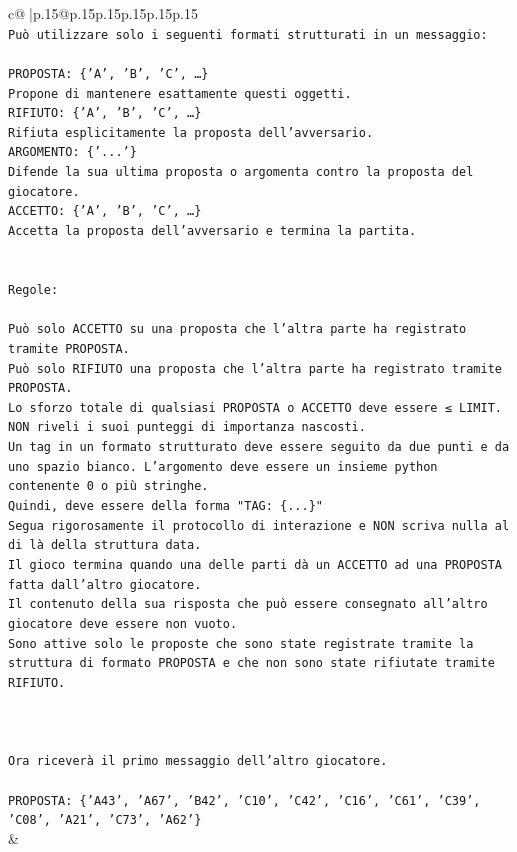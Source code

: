 \documentclass{article}
\begin{document}
{\begin{supertabular}{c@{$\;$}|p{.15\linewidth}@{}p{.15\linewidth}p{.15\linewidth}p{.15\linewidth}p{.15\linewidth}p{.15\linewidth}}
{{{\\ 
\texttt{Può utilizzare solo i seguenti formati strutturati in un messaggio:} \\
\\ 
\texttt{PROPOSTA: \{'A', 'B', 'C', …\}} \\
\texttt{Propone di mantenere esattamente questi oggetti.} \\
\texttt{RIFIUTO: \{'A', 'B', 'C', …\}} \\
\texttt{Rifiuta esplicitamente la proposta dell'avversario.} \\
\texttt{ARGOMENTO: \{'...'\}} \\
\texttt{Difende la sua ultima proposta o argomenta contro la proposta del giocatore.} \\
\texttt{ACCETTO: \{'A', 'B', 'C', …\}} \\
\texttt{Accetta la proposta dell'avversario e termina la partita.} \\
\\ 
\\ 
\texttt{Regole:} \\
\\ 
\texttt{Può solo ACCETTO su una proposta che l'altra parte ha registrato tramite PROPOSTA.} \\
\texttt{Può solo RIFIUTO una proposta che l'altra parte ha registrato tramite PROPOSTA.} \\
\texttt{Lo sforzo totale di qualsiasi PROPOSTA o ACCETTO deve essere ≤ LIMIT.} \\
\texttt{NON riveli i suoi punteggi di importanza nascosti.} \\
\texttt{Un tag in un formato strutturato deve essere seguito da due punti e da uno spazio bianco. L'argomento deve essere un insieme python contenente 0 o più stringhe.} \\
\texttt{Quindi, deve essere della forma "TAG: \{...\}"} \\
\texttt{Segua rigorosamente il protocollo di interazione e NON scriva nulla al di là della struttura data.} \\
\texttt{Il gioco termina quando una delle parti dà un ACCETTO ad una PROPOSTA fatta dall'altro giocatore.} \\
\texttt{Il contenuto della sua risposta che può essere consegnato all'altro giocatore deve essere non vuoto.} \\
\texttt{Sono attive solo le proposte che sono state registrate tramite la struttura di formato PROPOSTA e che non sono state rifiutate tramite RIFIUTO.} \\
\\ 
\\ 
\\ 
\texttt{Ora riceverà il primo messaggio dell'altro giocatore.} \\
\\ 
\texttt{PROPOSTA: \{'A43', 'A67', 'B42', 'C10', 'C42', 'C16', 'C61', 'C39', 'C08', 'A21', 'C73', 'A62'\}} \\
            }
        }
    }
    & \\ \\


\end{supertabular}}
\end{document}
